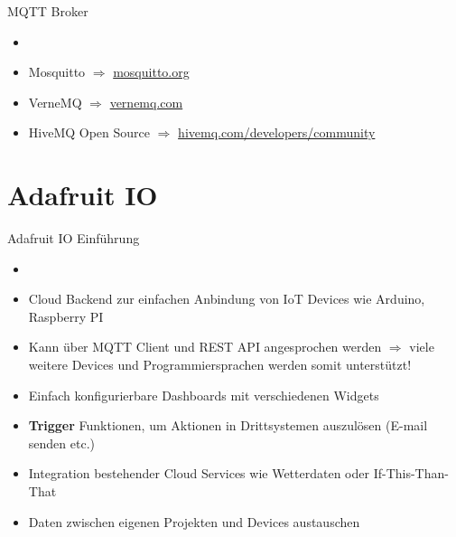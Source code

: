 \begin{frame}{MQTT Broker}
          \begin{itemize}
        \setlength{\itemindent}{1.45in}
        \item [\textbf{Broker für die Architektur}]
    \end{itemize}
    \begin{itemize}
        \item Mosquitto  $\Rightarrow$ \href{https://mosquitto.org}{mosquitto.org}
         \item VerneMQ  $\Rightarrow$ \href{https://vernemq.com}{vernemq.com}
         \item HiveMQ Open Source  $\Rightarrow$ \href{https://www.hivemq.com/developers/community}{hivemq.com/developers/community}
    \end{itemize}
\end{frame}


\section{Adafruit IO}

\begin{frame}{Adafruit IO Einführung}
 \begin{itemize}
        \setlength{\itemindent}{1.4in}
        \item [\textbf{Adafruit IO Einführung}]
    \end{itemize}
    \begin{itemize}
        \item Cloud Backend zur einfachen Anbindung von IoT Devices wie Arduino, Raspberry PI
        \item Kann über MQTT Client und REST  API angesprochen werden  $\Rightarrow$ viele weitere Devices und Programmiersprachen werden somit unterstützt!
        \item Einfach konfigurierbare Dashboards mit verschiedenen Widgets
        \item \textbf{Trigger} Funktionen, um Aktionen in Drittsystemen auszulösen (E-mail senden etc.)
        \item Integration bestehender Cloud Services wie Wetterdaten oder If-This-Than-That
        \item Daten zwischen eigenen Projekten und Devices austauschen
    \end{itemize}
\end{frame}


